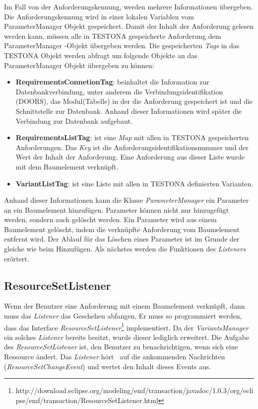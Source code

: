 Im Fall von der Anforderungskennung, werden mehrere Informationen übergeben. Die Anforderungskennung wird in einer lokalen Variablen vom ParameterManager Objekt gespeichert. Damit der Inhalt der Anforderung gelesen werden kann, müssen alle in TESTONA gespeicherte Anforderung dem ParameterManager -Objekt übergeben werden. Die gespeicherten \textit{Tags} in das TESTONA Objekt werden abfragt um folgende Objekte an das ParameterManager Objekt übergeben zu können:


\begin{itemize}
\item \textbf{RequirementsConnetionTag}: beinhaltet die Information zur Datenbankverbindung, unter anderem die Verbindungsidentifikation (DOORS), das Modul(Tabelle) in der die Anforderung gespeichert ist und die Schnittstelle zur Datenbank. Anhand dieser Informationen wird später die Verbindung zur Datenbank aufgebaut.
\item \textbf{RequirementsListTag}: ist eine \textit{Map} mit allen in TESTONA gespeicherten Anforderungen. Das \textit{Key} ist die Anforderungsidentifikationsnummer und der Wert der Inhalt der Anforderung. Eine Anforderung aus dieser Liste wurde mit dem Baumelement verknüpft.
\item \textbf{VariantListTag}: ist eine Liste mit allen in TESTONA definierten Varianten.
\end{itemize}


Anhand dieser Informationen kann die Klasse \textit{ParameterManager} ein Parameter an ein Baumelement hinzufügen. Parameter können nicht nur hinzugefügt werden, sondern auch gelöscht werden. Ein Parameter wird aus einem Baumelement gelöscht, indem die verknüpfte Anforderung vom Baumelement entfernt wird. Der Ablauf für das Löschen eines Parameter ist im Grunde der gleiche wie beim Hinzufügen. Als nächstes werden die Funktionen des \textit{Listeners} erörtert.




\subsection{ResourceSetListener}\label{sub:RSListner}
Wenn der Benutzer eine Anforderung mit einem Baumelement verknüpft, dann muss das \textit{Listener} das Geschehen abfangen. Er muss so programmiert werden, dass das Interface \textit{ResourceSetListener}\footnote{http://download.eclipse.org/modeling/emf/transaction/javadoc/1.0.3/org/eclipse/emf/transaction/ResourceSetListener.html} implementiert. Da der \textit{VariantsManager} ein solches \textit{Listener} bereits besitzt, wurde dieser lediglich erweitert. Die Aufgabe des \textit{ResourceSetListener} ist, den Benutzer zu benachrichtigen, wenn sich eine Ressource ändert. Das \textit{Listener}  \glqq hört\grqq~ auf die ankommenden Nachrichten (\textit{ResourceSetChangeEvent}) und wertet den Inhalt dieses Events aus.\\

